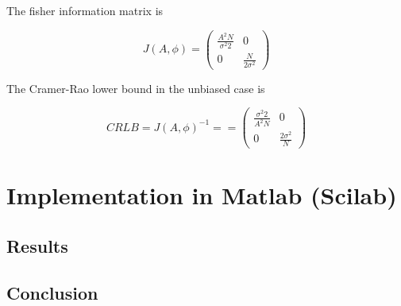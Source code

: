 \documentclass{report}
\begin{document}
The fisher information matrix is 


\begin{equation}
J(A,\phi)=\begin{pmatrix}
\frac{A^2N}{\sigma^2 2} & 0 \\ 
0 & \frac{N}{2\sigma^2}
\end{pmatrix} 
\end{equation}

The Cramer-Rao lower bound in the unbiased case is 

\begin{equation}
CRLB = J(A,\phi)^{-1} = =\begin{pmatrix}
\frac{\sigma^2 2}{A^2N} & 0 \\ 
0 & \frac{2\sigma^2}{N}
\end{pmatrix} 
\end{equation}




























\chapter{Implementation in Matlab (Scilab)}




\section{Results}





\section{Conclusion}


\end{document}
